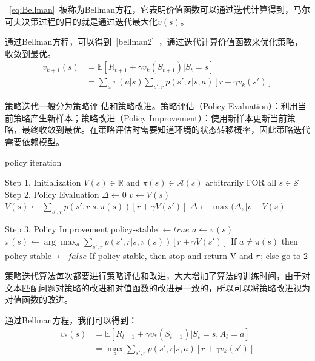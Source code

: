 ~\eqref{eq:Bellman}~被称为Bellman方程\cite{bellman1957markovian}，它表明价值函数可以通过迭代计算得到，马尔可夫决策过程的目的就是通过迭代最大化$v(s)$。

通过Bellman方程，可以得到~\eqref{bellman2}~，通过迭代计算价值函数来优化策略，收敛到最优。
\begin{equation}\label{bellman2}
\begin{aligned}
v_{k+1}(s) &= \mathbb{E}[R_{t+1}+\gamma v_k(S_{t+1})|S_t=s]\\
		   &= \sum_a \pi(a|s) \sum_{s',r}p(s',r|s,a)[r+\gamma v_k(s')]
\end{aligned}
\end{equation}

策略迭代一般分为策略评 估和策略改进。策略评估（Policy Evaluation）：利用当前策略产生新样本；策略改进（Policy Improvement）：使用新样本更新当前策略，最终收敛到最优。在策略评估时需要知道环境的状态转移概率，因此策略迭代需要依赖模型。

\begin{algorithm}[H]
    \small
    \caption{policy iteration}\label{alg:policy_iteration}
    \begin{algorithmic}
        \STATE Step 1. Initialization
        	\STATE $V(s) \in \mathbb{R}$ and $\pi(s) \in \mathcal{A}(s)$ arbitrarily FOR all $s \in \mathcal{S}$
        \STATE Step 2. Policy Evaluation
        \REPEAT
        \STATE $\Delta \leftarrow 0$
        \STATE $v \leftarrow V(s)$
        \STATE $V(s)\leftarrow \sum_{s', r} p(s', r|s, \pi(s))[r + \gamma V(s')]$
        \STATE $\Delta \leftarrow \max(\Delta, |v-V(s)|$
        \ENDFOR

        \UNTIL{$\Delta < \theta$}

        \STATE Step 3. Policy Improvement
        \STATE policy-stable $\leftarrow  true$
        \STATE $a \leftarrow \pi(s)$
        \STATE $\pi(s) \leftarrow \arg\max_a\sum_{s', r}p(s', r|s, \pi(s))[r + \gamma V(s')]$
        \STATE If $a \neq \pi(s)$ then policy-stable $\leftarrow  false$
        \ENDFOR
        \STATE If policy-stable, then stop and return V and $\pi$; else go to 2
    \end{algorithmic}
\end{algorithm}

策略迭代算法每次都要进行策略评估和改进，大大增加了算法的训练时间，由于对文本匹配问题对策略的改进和对值函数的改进是一致的，所以可以将策略改进视为对值函数的改进。

通过Bellman方程，我们可以得到：
\begin{equation}\label{bellman_val}
	\begin{aligned}
		v_*(s) &= \mathbb{E}[R_{t+1}+\gamma v_*(S_{t+1})|S_t=s,A_t=a] \\
			   &= \max_a \sum_{s',r}p(s', r|s, a)[r+\gamma v_k(s')]
	\end{aligned}
\end{equation}

